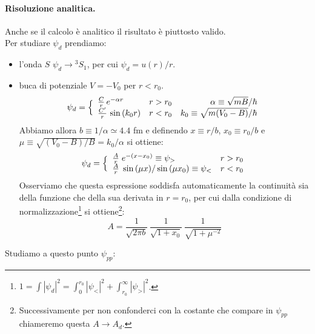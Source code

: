 \paragraph{Risoluzione analitica.} Anche se il calcolo è analitico il risultato è piuttosto valido.\\
Per studiare $\psi_d$ prendiamo:
\begin{itemize}
    \item l'onda $S$ $\psi_d\to{^3S_1}$, per cui $\psi_d = u(r)/r$.
    \item buca di potenziale $V = -V_0$ per $r<r_0$.
    $$%
    \psi_d = \Bigl \{
    \begin{array}{llr}
        \frac{C}{r}\, e^{-\alpha r } & r>r_0 & \alpha\equiv \sqrt{mB}/\hbar \\
        \frac{C'}{r}\, \sin{(k_0 r)} & r<r_0 & k_0 \equiv \sqrt{m(V_0-B)}/\hbar
    \end{array}%
    $$
    Abbiamo allora $b\equiv 1/\alpha \simeq 4.4$ fm e definendo $x\equiv r/b$, $x_0\equiv r_0/b$ e $\mu \equiv \sqrt{(V_0-B)/B}=k_0/\alpha$ si ottiene:
    $$%
    \psi_d = \Bigl \{
    \begin{array}{ll}
        \frac{A}{r}\; e^{-(x-x_0)}\equiv \psi_> & r>r_0 \\
        \frac{A}{r}\; \sin{(\mu x)}/\sin{(\mu x_0)}\equiv \psi_< & r<r_0
    \end{array}%
    $$
    Osserviamo che questa espressione soddisfa automaticamente la continuità sia della funzione che della sua derivata in $r=r_0$, per cui dalla condizione di normalizzazione\footnote{$1=\int |\psi_d|^2=\int_0^{r_0}|\psi_<|^2+\int_{r_0}^\infty|\psi_>|^2$.} si ottiene\footnote{Successivamente per non confonderci con la costante che compare in $\psi_{pp}$ chiameremo questa $A\to A_d$.}:
    $$A = \frac{1}{\sqrt{2\pi b}}\, \frac{1}{\sqrt{1+x_0}}\,\frac{1}{\sqrt{1+\mu^{-2}}}$$
\end{itemize}
Studiamo a questo punto $\psi_{pp}$:

